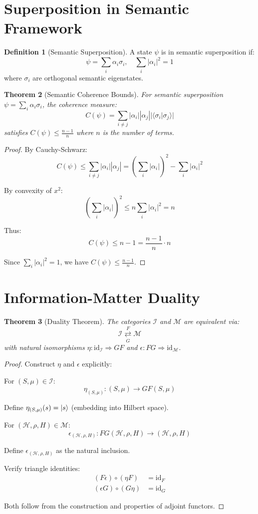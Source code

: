 \documentclass[12pt,a4paper]{article}
\theoremstyle{plain}
\newtheorem{theorem}{Theorem}[section]
\theoremstyle{definition}
\newtheorem{definition}[theorem]{Definition}
\newcommand{\Hil}{\mathcal{H}}
\newcommand{\Info}{\mathcal{I}}
\newcommand{\Matter}{\mathcal{M}}
\newcommand{\id}{\mathrm{id}}
\begin{document}
\section{Superposition in Semantic Framework}

\begin{definition}[Semantic Superposition]
A state $\psi$ is in semantic superposition if:
\[
\psi = \sum_i \alpha_i \sigma_i, \quad \sum_i |\alpha_i|^2 = 1
\]
where $\sigma_i$ are orthogonal semantic eigenstates.
\end{definition}

\begin{theorem}[Semantic Coherence Bounds]
For semantic superposition $\psi = \sum_i \alpha_i \sigma_i$, the coherence measure:
\[
C(\psi) = \sum_{i \neq j} |\alpha_i||\alpha_j||\langle\sigma_i|\sigma_j\rangle|
\]
satisfies $C(\psi) \leq \frac{n-1}{n}$ where $n$ is the number of terms.
\end{theorem}

\begin{proof}
By Cauchy-Schwarz:
\[
C(\psi) \leq \sum_{i \neq j} |\alpha_i||\alpha_j| = \left(\sum_i |\alpha_i|\right)^2 - \sum_i |\alpha_i|^2
\]

By convexity of $x^2$:
\[
\left(\sum_i |\alpha_i|\right)^2 \leq n \sum_i |\alpha_i|^2 = n
\]

Thus:
\[
C(\psi) \leq n - 1 = \frac{n-1}{n} \cdot n
\]

Since $\sum_i |\alpha_i|^2 = 1$, we have $C(\psi) \leq \frac{n-1}{n}$.
\end{proof}

\section{Information-Matter Duality}

\begin{theorem}[Duality Theorem]
The categories $\Info$ and $\Matter$ are equivalent via:
\[
\Info \underset{G}{\overset{F}{\rightleftarrows}} \Matter
\]
with natural isomorphisms $\eta: \id_{\Info} \Rightarrow GF$ and $\epsilon: FG \Rightarrow \id_{\Matter}$.
\end{theorem}

\begin{proof}
Construct $\eta$ and $\epsilon$ explicitly:

For $(S, \mu) \in \Info$:
\[
\eta_{(S,\mu)}: (S, \mu) \to GF(S, \mu)
\]

Define $\eta_{(S,\mu)}(s) = \ket{s}$ (embedding into Hilbert space).

For $(\Hil, \rho, H) \in \Matter$:
\[
\epsilon_{(\Hil,\rho,H)}: FG(\Hil, \rho, H) \to (\Hil, \rho, H)
\]

Define $\epsilon_{(\Hil,\rho,H)}$ as the natural inclusion.

Verify triangle identities:
\begin{align}
(F \epsilon) \circ (\eta F) &= \id_F \\
(\epsilon G) \circ (G \eta) &= \id_G
\end{align}

Both follow from the construction and properties of adjoint functors.
\end{proof}
\end{document}
